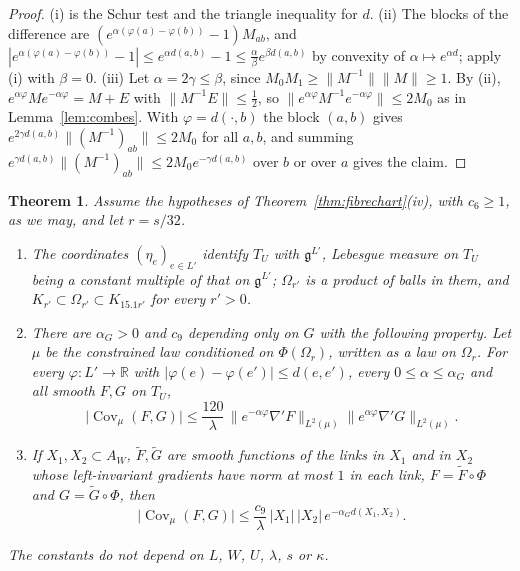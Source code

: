 \documentclass[11pt]{amsart}
\newtheorem{theorem}{Theorem}[section]
\theoremstyle{definition}
\theoremstyle{remark}
\numberwithin{equation}{section}
\newcommand{\R}{\mathbb{R}}
\newcommand{\g}{\mathfrak{g}}
\begin{document}
\begin{proof}
(i) is the Schur test and the triangle inequality for $d$. (ii) The blocks
of the difference are $(e^{\alpha(\varphi(a)-\varphi(b))}-1)M_{ab}$, and
$|e^{\alpha(\varphi(a)-\varphi(b))}-1|\le e^{\alpha d(a,b)}-1\le\frac
\alpha\beta e^{\beta d(a,b)}$ by convexity of $\alpha\mapsto e^{\alpha d}$;
apply (i) with $\beta=0$. (iii) Let $\alpha=2\gamma\le\beta$, since $M_0M_1
\ge\lVert M^{-1}\rVert\lVert M\rVert\ge1$. By (ii), $e^{\alpha\varphi}M
e^{-\alpha\varphi}=M+E$ with $\lVert M^{-1}E\rVert\le\frac12$, so
$\lVert e^{\alpha\varphi}M^{-1}e^{-\alpha\varphi}\rVert\le2M_0$ as in
Lemma~\ref{lem:combes}. With $\varphi=d(\cdot,b)$ the block $(a,b)$ gives
$e^{2\gamma d(a,b)}\lVert(M^{-1})_{ab}\rVert\le2M_0$ for all $a,b$, and
summing $e^{\gamma d(a,b)}\lVert(M^{-1})_{ab}\rVert\le2M_0e^{-\gamma
d(a,b)}$ over $b$ or over $a$ gives the claim.
\end{proof}

\begin{theorem}\label{thm:chartdecay}
Assume the hypotheses of Theorem~\ref{thm:fibrechart}\textup{(iv)}, with
$c_6\ge1$, as we may, and let $r=s/32$.
\begin{enumerate}[label=\textup{(\roman*)},leftmargin=*]
\item The coordinates $(\eta_e)_{e\in L'}$ identify $T_U$ with $\g^{L'}$,
Lebesgue measure on $T_U$ being a constant multiple of that on $\g^{L'}$;
$\Omega_{r'}$ is a product of balls in them, and $K_{r'}\subset\Omega_{r'}
\subset K_{15.1r'}$ for every $r'>0$.
\item There are $\alpha_G>0$ and $c_9$ depending only on $G$ with the
following property. Let $\mu$ be the constrained law conditioned on
$\Phi(\Omega_r)$, written as a law on $\Omega_r$. For every $\varphi:L'\to
\R$ with $|\varphi(e)-\varphi(e')|\le d(e,e')$, every $0\le\alpha\le
\alpha_G$ and all smooth $F,G$ on $T_U$,
\[
\lvert\operatorname{Cov}_\mu(F,G)\rvert\le\frac{120}\lambda\,\bigl\lVert
e^{-\alpha\varphi}\nabla'F\bigr\rVert_{L^2(\mu)}\bigl\lVert e^{\alpha
\varphi}\nabla'G\bigr\rVert_{L^2(\mu)}.
\]
\item If $X_1,X_2\subset A_W$, $\tilde F,\tilde G$ are smooth functions of
the links in $X_1$ and in $X_2$ whose left-invariant gradients have norm at
most $1$ in each link, $F=\tilde F\circ\Phi$ and $G=\tilde G\circ\Phi$, then
\[
\lvert\operatorname{Cov}_\mu(F,G)\rvert\le\frac{c_9}\lambda\,\lvert X_1
\rvert\,\lvert X_2\rvert\,e^{-\alpha_Gd(X_1,X_2)}.
\]
\end{enumerate}
The constants do not depend on $L$, $W$, $U$, $\lambda$, $s$ or $\kappa$.
\end{theorem}
\end{document}
